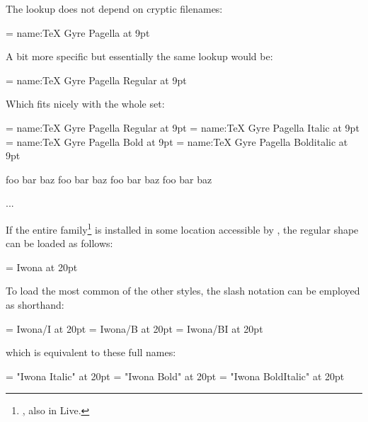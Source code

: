 \endsubsubsection


The  lookup does not depend on cryptic filenames:

\beginlisting
  \font \pagellaregular = {name:TeX Gyre Pagella} at 9pt
\endlisting

A bit more specific but essentially the same lookup would be:

\beginlisting
  \font \pagellaregular = {name:TeX Gyre Pagella Regular} at 9pt
\endlisting

\noindent
Which fits nicely with the whole set:

\beginlisting
  \font\pagellaregular    = {name:TeX Gyre Pagella Regular}    at 9pt
  \font\pagellaitalic     = {name:TeX Gyre Pagella Italic}     at 9pt
  \font\pagellabold       = {name:TeX Gyre Pagella Bold}       at 9pt
  \font\pagellabolditalic = {name:TeX Gyre Pagella Bolditalic} at 9pt

  {\pagellaregular     foo bar baz\endgraf}
  {\pagellaitalic      foo bar baz\endgraf}
  {\pagellabold        foo bar baz\endgraf}
  {\pagellabolditalic  foo bar baz\endgraf}

  ...
\endlisting

\endsubsubsection


If the entire  family\footnote{%
  \hyperlink {http://jmn.pl/kurier-i-iwona/},
  also in \TEX Live.
}
is installed in some location accessible by ,
the regular shape can be loaded as follows:

\beginlisting
  \font \iwona = Iwona at 20pt
\endlisting

\noindent
To load the most common of the other styles, the slash notation can
be employed as shorthand:

\beginlisting
  \font \iwonaitalic     = Iwona/I    at 20pt
  \font \iwonabold       = Iwona/B    at 20pt
  \font \iwonabolditalic = Iwona/BI   at 20pt
\endlisting

\noindent
which is equivalent to these full names:

\beginlisting
  \font \iwonaitalic     = "Iwona Italic"       at 20pt
  \font \iwonabold       = "Iwona Bold"         at 20pt
  \font \iwonabolditalic = "Iwona BoldItalic"   at 20pt
\endlisting

\endsubsubsection
\endsubsection
\endsection


